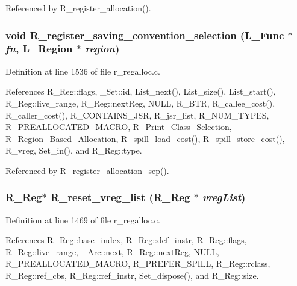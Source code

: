 Referenced by R\_\-register\_\-allocation().
\subsubsection{\setlength{\rightskip}{0pt plus 5cm}void R\_\-register\_\-saving\_\-convention\_\-selection (L\_\-Func $\ast$ {\em fn}, L\_\-Region $\ast$ {\em region})}\label{r__regalloc_8c_9af90de44d134252172d0a091e080125}




Definition at line 1536 of file r\_\-regalloc.c.

References R\_\-Reg::flags, \_\-Set::id, List\_\-next(), List\_\-size(), List\_\-start(), R\_\-Reg::live\_\-range, R\_\-Reg::next\-Reg, NULL, R\_\-BTR, R\_\-callee\_\-cost(), R\_\-caller\_\-cost(), R\_\-CONTAINS\_\-JSR, R\_\-jsr\_\-list, R\_\-NUM\_\-TYPES, R\_\-PREALLOCATED\_\-MACRO, R\_\-Print\_\-Class\_\-Selection, R\_\-Region\_\-Based\_\-Allocation, R\_\-spill\_\-load\_\-cost(), R\_\-spill\_\-store\_\-cost(), R\_\-vreg, Set\_\-in(), and R\_\-Reg::type.

Referenced by R\_\-register\_\-allocation\_\-sep().
\subsubsection{\setlength{\rightskip}{0pt plus 5cm}\bf{R\_\-Reg}$\ast$ R\_\-reset\_\-vreg\_\-list (\bf{R\_\-Reg} $\ast$ {\em vreg\-List})}\label{r__regalloc_8c_11406665bb3680ed70a386f69422f60e}




Definition at line 1469 of file r\_\-regalloc.c.

References R\_\-Reg::base\_\-index, R\_\-Reg::def\_\-instr, R\_\-Reg::flags, R\_\-Reg::live\_\-range, \_\-Arc::next, R\_\-Reg::next\-Reg, NULL, R\_\-PREALLOCATED\_\-MACRO, R\_\-PREFER\_\-SPILL, R\_\-Reg::rclass, R\_\-Reg::ref\_\-cbs, R\_\-Reg::ref\_\-instr, Set\_\-dispose(), and R\_\-Reg::size.
